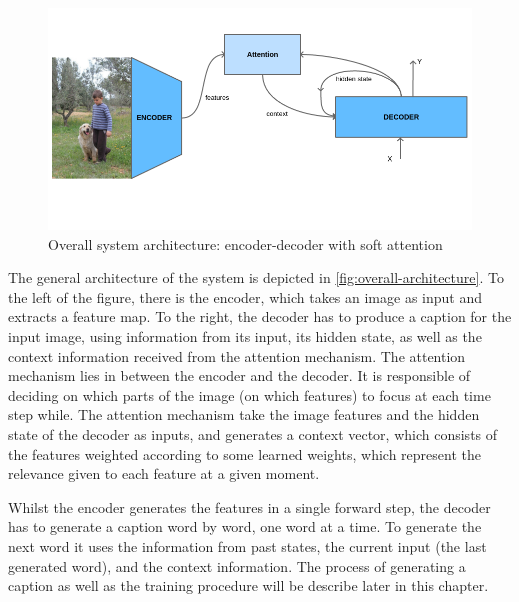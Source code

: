 \begin{figure}[hpt]
	\centering
	\includegraphics[scale=0.5]{images/ch4/overview.png}
	\caption{Overall system architecture: encoder-decoder with soft attention}
	\label{fig:overview}
\end{figure}

The general architecture of the system is depicted in \cref{fig:overall-architecture}. To the left of the figure, there is the encoder, which takes an image as input and extracts a feature map. To the right, the decoder has to produce a caption for the input image, using information from its input, its hidden state, as well as the context information received from the attention mechanism. The attention mechanism lies in between the encoder and the decoder. It is responsible of deciding on which parts of the image (on which features) to focus at each time step while. The attention mechanism take the image features and the hidden state of the decoder as inputs, and generates a context vector, which consists of the features weighted according to some learned weights, which represent the relevance given to each feature at a given moment.

Whilst the encoder generates the features in a single forward step, the decoder has to generate a caption word by word, one word at a time. To generate the next word it uses the information from past states, the current input (the last generated word), and the context information. The process of generating a caption as well as the training procedure will be describe later in this chapter.

